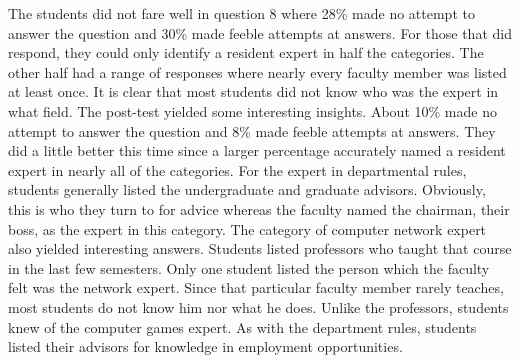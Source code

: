 
The students did not fare well in question 8 where 28\% made no attempt to
answer the question and 30\% made feeble attempts at answers.  For those that
did respond, they could only identify a resident expert in half the categories.
The other half had a range of responses where nearly every faculty member was
listed at least once.  It is clear that most students did not know who was the
expert in what field.  The post-test yielded some interesting insights.  About
10\% made no attempt to answer the question and 8\% made feeble attempts at
answers.  They did a little better this time since a larger percentage
accurately named a resident expert in nearly all of the categories.  For the
expert in departmental rules, students generally listed the undergraduate and
graduate advisors.  Obviously, this is who they turn to for advice whereas the
faculty named the chairman, their boss, as the expert in this category.  The
category of computer network expert also yielded interesting answers.  Students
listed professors who taught that course in the last few semesters.  Only one
student listed the person which the faculty felt was the network expert.  Since
that particular faculty member rarely teaches, most students do not know him
nor what he does.  Unlike the professors, students knew of the computer games
expert.  As with the department rules, students listed their advisors for
knowledge in employment opportunities.

